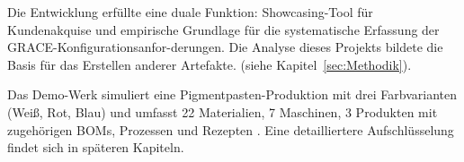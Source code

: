 \noindent Die Entwicklung erfüllte eine duale Funktion: Showcasing-Tool für Kundenakquise und empirische Grundlage für die systematische Erfassung der GRACE-Konfigurationsanfor-derungen. Die Analyse dieses Projekts bildete die Basis für das Erstellen anderer Artefakte. (siehe Kapitel~\ref{sec:Methodik}).

\noindent Das Demo-Werk simuliert eine Pigmentpasten-Produktion mit drei Farbvarianten (Weiß, Rot, Blau) und umfasst 22 Materialien, 7 Maschinen, 3 Produkten mit zugehörigen BOMs, Prozessen und Rezepten \citep{grace:demo_werk_restored2026}. Eine detailliertere Aufschlüsselung findet sich in späteren Kapiteln.  
